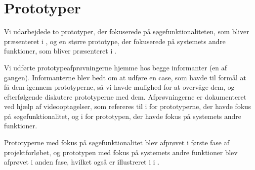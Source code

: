 \section{Prototyper}
\label{sec:prototyper}

Vi udarbejdede to prototyper, der fokuserede på søgefunktionaliteten, som bliver præsenteret i , og en større prototype, der fokuserede på systemets andre funktioner, som bliver præsenteret i .

Vi udførte prototypeafprøvningerne hjemme hos begge informanter (en af gangen). 
Informanterne blev bedt om at udføre en case, som havde til formål at få dem igennem prototyperne, så vi havde mulighed for at overvåge dem, og efterfølgende diskutere prototyperne med dem.
Afprøvningerne er dokumenteret ved hjælp af videooptagelser, som refereres til i  for prototyperne, der havde fokus på søgefunktionalitet, og i  for prototypen, der havde fokus på systemets andre funktioner.

Prototyperne med fokus på søgefunktionalitet blev afprøvet i første fase af projektforløbet, og prototypen med fokus på systemets andre funktioner blev afprøvet i anden fase, hvilket også er illustreret i  i .





